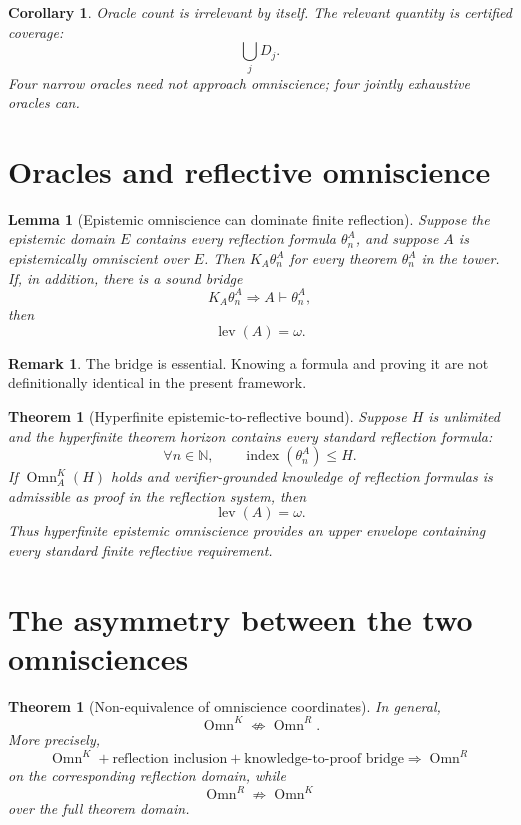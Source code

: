 \documentclass[11pt]{article}
\theoremstyle{definition}
\newtheorem{remark}[definition]{Remark}
\theoremstyle{plain}
\newtheorem{lemma}[definition]{Lemma}
\newtheorem{theorem}[definition]{Theorem}
\newtheorem{corollary}[definition]{Corollary}
\newcommand{\lev}{\operatorname{lev}}
\newcommand{\Omn}{\operatorname{Omn}}
\begin{document}
\begin{corollary}
Oracle count is irrelevant by itself. The relevant quantity is certified coverage:
\[
\bigcup_jD_j.
\]
Four narrow oracles need not approach omniscience; four jointly exhaustive oracles can.
\end{corollary}

\section{Oracles and reflective omniscience}

\begin{lemma}[Epistemic omniscience can dominate finite reflection]
Suppose the epistemic domain $E$ contains every reflection formula $\theta_n^A$, and suppose $A$ is epistemically omniscient over $E$. Then $K_A\theta_n^A$ for every theorem $\theta_n^A$ in the tower. If, in addition, there is a sound bridge
\[
K_A\theta_n^A\Longrightarrow A\vdash\theta_n^A,
\]
then
\[
\lev(A)=\omega.
\]
\end{lemma}

\begin{remark}
The bridge is essential. Knowing a formula and proving it are not definitionally identical in the present framework.
\end{remark}

\begin{theorem}[Hyperfinite epistemic-to-reflective bound]
Suppose $H$ is unlimited and the hyperfinite theorem horizon contains every standard reflection formula:
\[
\forall n\in\mathbb N,\qquad\operatorname{index}(\theta_n^A)\le H.
\]
If $\Omn_A^K(H)$ holds and verifier-grounded knowledge of reflection formulas is admissible as proof in the reflection system, then
\[
\lev(A)=\omega.
\]
Thus hyperfinite epistemic omniscience provides an upper envelope containing every standard finite reflective requirement.
\end{theorem}

\section{The asymmetry between the two omnisciences}

\begin{theorem}[Non-equivalence of omniscience coordinates]
In general,
\[
\Omn^K\not\Longleftrightarrow\Omn^R.
\]
More precisely,
\[
\Omn^K+\text{reflection inclusion}+\text{knowledge-to-proof bridge}
\Longrightarrow\Omn^R
\]
on the corresponding reflection domain, while
\[
\Omn^R\not\Longrightarrow\Omn^K
\]
over the full theorem domain.
\end{theorem}
\end{document}
